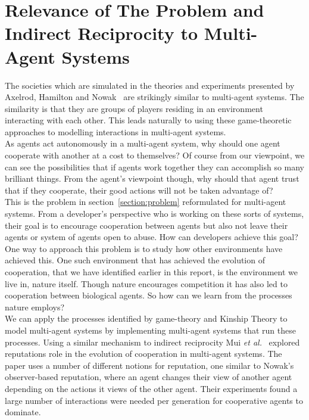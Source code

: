 \documentclass[]{final_report}
\begin{document}
\section{Relevance of The Problem and Indirect Reciprocity to Multi-Agent Systems}
The societies which are simulated in the theories and experiments presented by Axelrod, Hamilton and Nowak~\cite{evolution_of_cooperation, five_rules_coop} are strikingly similar to multi-agent systems. The similarity is that they are groups of players residing in an environment interacting with each other. This leads naturally to using these game-theoretic approaches to modelling interactions in multi-agent systems.\\
As agents act autonomously in a multi-agent system, why should one agent cooperate with another at a cost to themselves? Of course from our viewpoint, we can see the possibilities that if agents work together they can accomplish so many brilliant things. From the agent's viewpoint though, why should that agent trust that if they cooperate, their good actions will not be taken advantage of?\\
This is the problem in section~\ref{section:problem} reformulated for multi-agent systems. From a developer's perspective who is working on these sorts of systems, their goal is to encourage cooperation between agents but also not leave their agents or system of agents open to abuse. How can developers achieve this goal?\\
One way to approach this problem is to study how other environments have achieved this. One such environment that has achieved the evolution of cooperation, that we have identified earlier in this report, is the environment we live in, nature itself. Though nature encourages competition it has also led to cooperation between biological agents. So how can we learn from the processes nature employs?\\
We can apply the processes identified by game-theory and Kinship Theory to model multi-agent systems by implementing multi-agent systems that run these processes. Using a similar mechanism to indirect reciprocity Mui \textit{et al.}~\cite{Mui:2002:NRM:544741.544807} explored reputations role in the evolution of cooperation in multi-agent systems. The paper uses a number of different notions for reputation, one similar to Nowak's observer-based reputation, where an agent changes their view of another agent depending on the actions it views of the other agent. Their experiments found a large number of interactions were needed per generation for cooperative agents to dominate.\\
\end{document}

